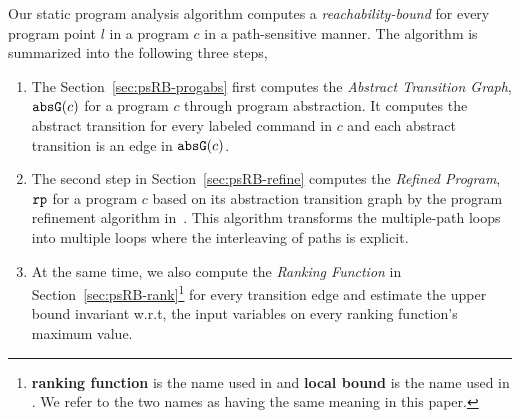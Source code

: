 Our static program analysis algorithm computes 
a \emph{reachability-bound} for every program point $l$ in a program $c$ in a path-sensitive manner.
The algorithm is summarized into the following three steps,
\begin{enumerate}
\item The Section~\ref{sec:psRB-progabs} first 
computes the \emph{Abstract Transition Graph}, $\mathtt{abs}{\mathtt{G}}(c)$ for a program $c$ through program abstraction.
It computes the abstract transition 
for every labeled command in $c$ and each abstract transition is an edge in $\mathtt{abs}{\mathtt{G}}(c)$.
\item The second step in Section~\ref{sec:psRB-refine}
computes the \emph{Refined Program}, $\mathtt{rp}$ for a program $c$ based on 
its abstraction transition graph by the program refinement algorithm in~\cite{GulwaniJK09}.
This algorithm transforms the multiple-path loops
into multiple loops where
the interleaving of paths is explicit.
\item At the same time, we also compute the \emph{Ranking Function} in Section~\ref{sec:psRB-rank}\footnote{\textbf{ranking function} is the name used in \cite{SinnZV14}
and \textbf{local bound} is the name used in \cite{ZulegerGSV11, SinnZV17}.
We refer to the two names as having the same meaning in this paper.} for every transition edge 
and estimate the upper bound invariant w.r.t, the input variables on every ranking function's maximum value.


\end{enumerate}
